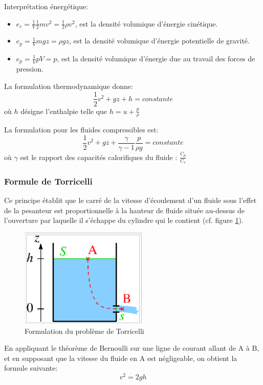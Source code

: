 \documentclass[10pt,a4paper]{article}
\begin{document}
Interprétation énergétique:
\begin{itemize}
\item $e_{c} = \frac{1}{V}\frac{1}{2}mv^{2} = \frac{1}{2}\rho v^{2}$, est la densité volumique d'énergie cinétique.
\item $e_{p} = \frac{1}{V}mgz = \rho gz$, est la densité volumique d'énergie potentielle de gravité.
\item $e_{p} = \frac{1}{V} pV = p$, est la densité volumique d'énergie due au travail des forces de pression.
\end{itemize}

La formulation thermodynamique donne:
\begin{equation}
\frac{1}{2}v^{2} + gz + h = constante
\end{equation}
où $h$ désigne l'enthalpie telle que $h = u + \frac{p}{\rho}$

La formulation pour les fluides compressibles est:
\begin{equation}
\frac{1}{2}v^{2} + gz + \frac{\gamma}{\gamma - 1}\frac{p}{\rho g} = constante
\end{equation}
où $\gamma$ est le rapport des capacités calorifiques du fluide : $\frac{C_{p}}{C_{v}}$

\subsubsection{Formule de Torricelli\cite{torricelli}}
Ce principe établit que le carré de la vitesse d'écoulement d'un fluide sous l'effet de la pesanteur est proportionnelle à la hauteur de fluide située au-dessus de l'ouverture par laquelle il s'échappe du cylindre qui le contient (cf. figure \ref{fig:torricelli}).
\begin{figure}
\centering
\includegraphics[scale=0.5]{torricelli}
\caption{Formulation du problème de Torricelli}
\label{fig:torricelli}
\end{figure}
En appliquant le théorème de Bernoulli sur une ligne de courant allant de A à B, et en supposant que la vitesse du fluide en A est négligeable, on obtient la formule suivante:
\begin{equation}
v^{2} = 2gh
\end{equation}







\newpage


\end{document}
